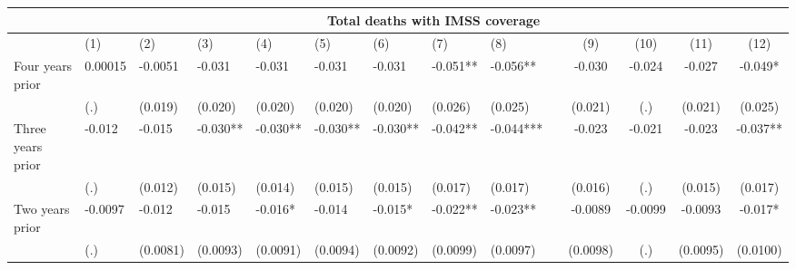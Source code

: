 \begin{tabular}{lccccrrrrrcccc}
\toprule
      & \multicolumn{13}{c}{Total deaths with IMSS coverage} \\
\midrule
      & \multicolumn{1}{l}{(1)} & \multicolumn{1}{l}{(2)} & \multicolumn{1}{l}{(3)} & \multicolumn{1}{l}{(4)} & \multicolumn{1}{l}{(5)} & \multicolumn{1}{l}{(6)} & \multicolumn{1}{l}{(7)} & \multicolumn{1}{l}{(8)} &       & (9)   & (10)  & (11)  & (12) \\
\midrule
\midrule
Four years prior & \multicolumn{1}{l}{0.00015} & \multicolumn{1}{l}{-0.0051} & \multicolumn{1}{l}{-0.031} & \multicolumn{1}{l}{-0.031} & \multicolumn{1}{l}{-0.031} & \multicolumn{1}{l}{-0.031} & \multicolumn{1}{l}{-0.051**} & \multicolumn{1}{l}{-0.056**} &       & -0.030 & -0.024 & -0.027 & -0.049* \\
      & \multicolumn{1}{l}{(.)} & \multicolumn{1}{l}{(0.019)} & \multicolumn{1}{l}{(0.020)} & \multicolumn{1}{l}{(0.020)} & \multicolumn{1}{l}{(0.020)} & \multicolumn{1}{l}{(0.020)} & \multicolumn{1}{l}{(0.026)} & \multicolumn{1}{l}{(0.025)} &       & (0.021) & (.)   & (0.021) & (0.025) \\
Three years prior & \multicolumn{1}{l}{-0.012} & \multicolumn{1}{l}{-0.015} & \multicolumn{1}{l}{-0.030**} & \multicolumn{1}{l}{-0.030**} & \multicolumn{1}{l}{-0.030**} & \multicolumn{1}{l}{-0.030**} & \multicolumn{1}{l}{-0.042**} & \multicolumn{1}{l}{-0.044***} &       & -0.023 & -0.021 & -0.023 & -0.037** \\
      & \multicolumn{1}{l}{(.)} & \multicolumn{1}{l}{(0.012)} & \multicolumn{1}{l}{(0.015)} & \multicolumn{1}{l}{(0.014)} & \multicolumn{1}{l}{(0.015)} & \multicolumn{1}{l}{(0.015)} & \multicolumn{1}{l}{(0.017)} & \multicolumn{1}{l}{(0.017)} &       & (0.016) & (.)   & (0.015) & (0.017) \\
Two years prior & \multicolumn{1}{l}{-0.0097} & \multicolumn{1}{l}{-0.012} & \multicolumn{1}{l}{-0.015} & \multicolumn{1}{l}{-0.016*} & \multicolumn{1}{l}{-0.014} & \multicolumn{1}{l}{-0.015*} & \multicolumn{1}{l}{-0.022**} & \multicolumn{1}{l}{-0.023**} &       & -0.0089 & -0.0099 & -0.0093 & -0.017* \\
      & \multicolumn{1}{l}{(.)} & \multicolumn{1}{l}{(0.0081)} & \multicolumn{1}{l}{(0.0093)} & \multicolumn{1}{l}{(0.0091)} & \multicolumn{1}{l}{(0.0094)} & \multicolumn{1}{l}{(0.0092)} & \multicolumn{1}{l}{(0.0099)} & \multicolumn{1}{l}{(0.0097)} &       & (0.0098) & (.)   & (0.0095) & (0.0100) \\

\end{tabular}
